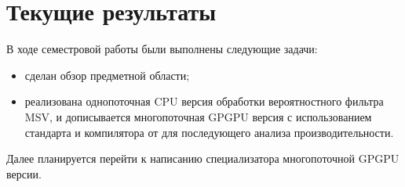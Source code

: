 \section{Текущие результаты}
В ходе семестровой работы были выполнены следующие задачи:
\begin{itemize}
	\item сделан обзор предметной области;
	\item реализована однопоточная CPU версия обработки вероятностного фильтра 
		MSV, и дописывается многопоточная GPGPU версия с использованием 
		стандарта  и компилятора от  для последующего 
		анализа производительности.
\end{itemize}

Далее планируется перейти к написанию специализатора многопоточной GPGPU версии.
